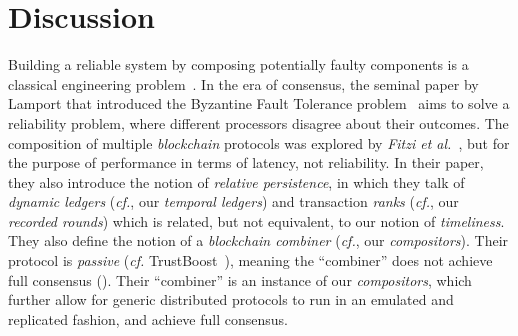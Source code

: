 \section{Discussion}

Building a reliable system by composing potentially faulty components
is a classical engineering problem~\cite{von1956probabilistic,moore1956reliable}.
In the era of consensus, the seminal
paper by Lamport that introduced the Byzantine Fault Tolerance problem~\cite{shostak1982byzantine}
aims to solve a reliability problem, where different processors disagree about their
outcomes. The composition of multiple \emph{blockchain} protocols was explored by
\emph{Fitzi et al.}~\cite{combiners}, but for the purpose of performance in terms of
latency, not reliability. In their paper, they also introduce the notion of
\emph{relative persistence}, in which they talk of \emph{dynamic ledgers} (\emph{cf.}, our
\emph{temporal ledgers}) and transaction \emph{ranks} (\emph{cf.}, our \emph{recorded rounds})
which is related, but not equivalent, to our notion of \emph{timeliness}.
They also define the notion of a \emph{blockchain combiner} (\emph{cf.}, our \emph{compositors}).
Their protocol is \emph{passive} (\emph{cf.} TrustBoost~\cite{trustboost}),
meaning the ``combiner'' does not achieve full consensus (\cite[Section 5]{combiners}).
Their ``combiner'' is an instance of our \emph{compositors}, which
further allow for generic distributed protocols to run in an emulated and
replicated fashion, and achieve full consensus.

